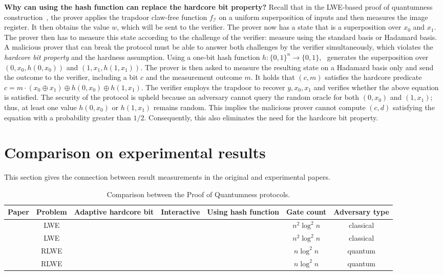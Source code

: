 \documentclass[cryptography,review,submit,pdftex,moreauthors,amsmath,amssymb,aps,strict]{Definitions/mdpi}
\newcommand{\cmark}{\ding{51}}%
\newcommand{\xmark}{\ding{55}}%
\begin{document}
\textbf{Why can using the hash function can replace the hardcore bit property?} Recall that in the LWE-based proof of quantumness construction~\cite{Brakerski18_Interactiveproofofquantumness}, the prover applies the trapdoor claw-free function $f_{\mathcal{I}}$ on a uniform superposition of inputs and then measures the image register. It then obtains the value $w$, which will be sent to the verifier. The prover now has a state that is a superposition over $x_0$ and $x_1$. The prover then has to measure this state according to the challenge of the verifier: measure using the standard basis or Hadamard basis. A malicious prover that can break the protocol must be able to answer both challenges by the verifier simultaneously, which violates the \textit{hardcore bit property} and the hardness assumption. Using a one-bit hash function $h:\{0,1\}^n\to \{0,1\}$,~\cite{BrakerskiProofofQuantumness} generates the superposition over $(0,x_0,h(0,x_0))$ and $(1,x_1,h(1,x_1))$. The prover is then asked to measure the resulting state on a Hadamard basis only and send the outcome to the verifier, including a bit $c$ and the measurement outcome $m$. It holds that $(c,m)$ satisfies the hardcore predicate $c=m\cdot(x_0\oplus x_1)\oplus h(0,x_0)\oplus h(1,x_1)$. The verifier employs the trapdoor to recover $y,x_0,x_1$ and verifies whether the above equation is satisfied. The security of the protocol is upheld because an adversary cannot query the random oracle for both $(0,x_0)$ and $(1,x_1)$; thus, at least one value $h(0,x_0)$ or $h(1,x_1)$ remains random. This implies the malicious prover cannot compute $(c,d)$ satisfying the equation with a probability greater than $1/2$. Consequently, this also eliminates the need for the hardcore bit property.

\section{Comparison on experimental results}

This section gives the connection between result measurements in the original and experimental papers.

\begin{table}[!htp] 
\caption{Comparison between the Proof of Quantumness protocols.\label{t_2}\label{tab:compare}}
\begin{tabularx}{\textwidth}{CCCCCCC}
\toprule
\textbf{Paper}	& \textbf{Problem}	& \textbf{Adaptive hardcore bit} &\textbf{Interactive}&\textbf{Using hash function}&\textbf{Gate count}&\textbf{Adversary type}\\
\midrule
\cite{Brakerski18_Interactiveproofofquantumness} & LWE	& \cmark & \cmark & \xmark & $n^2\log^2n$ & classical\\
\cite{experiment_interactive_PoQ} & LWE	& \cmark & \cmark & \xmark & $n^2\log^2n$ & classical\\
\cite{BrakerskiProofofQuantumness} & RLWE & \xmark & \xmark & \cmark & $n\log^2n$ & quantum\\
\cite{experiment_non_interactive_PoQ} & RLWE & \xmark & \xmark & \cmark & $n\log^2n$ & quantum\\
\bottomrule
\end{tabularx}
\end{table}
\end{document}
